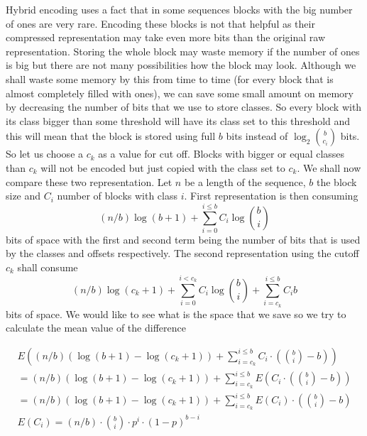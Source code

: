 Hybrid encoding uses a fact that in some sequences blocks with the big number
of ones are very rare. Encoding these blocks is not that helpful as their
compressed representation may take even more bits than the original raw
representation. Storing the whole block may waste memory if the number of
ones is big but there are not many possibilities how the block may look.
Although we shall waste some memory by this from time to time (for every
block that is almost completely filled with ones), we can save some small
amount on memory by decreasing the number of bits that we use to store
classes. So every block with its class bigger than some threshold will
have its class set to this threshold and this will mean that the block
is stored using full $b$ bits instead of $\log_2{b\choose c_i}$ bits.
So let us choose a $c_k$ as a value for cut off. Blocks with bigger or
equal classes than $c_k$ will not be encoded but just copied with
the class set to $c_k$. We shall now compare these two representation.
Let $n$ be a length of the sequence, $b$ the block size and $C_i$
number of blocks with class $i$. First representation is then consuming
$$(n/b)\log (b+1) + \sum_{i=0}^{i\leq b} C_i\log {b\choose i}$$
bits of space with the first and second term being the number of bits that
is used by the classes and offsets respectively. The second representation
using the cutoff $c_k$ shall consume
$$(n/b)\log (c_k+1)+\sum_{i=0}^{i<c_k}C_i\log {b\choose i} + \sum_{i=c_k}^{i\leq b}C_i b$$
bits of space. We would like to see what is the space that we save so we
try to calculate the mean value of the difference 

\begin{align*}
E\left((n/b)(\log (b+1) - \log (c_k+1)) + \sum_{i=c_k}^{i\leq b}C_i\cdot \left({b\choose i} - b\right)\right)\\
=(n/b)(\log (b+1) - \log (c_k+1)) + \sum_{i=c_k}^{i\leq b}E\left(C_i\cdot \left({b\choose i} - b\right)\right)\\
=(n/b)(\log (b+1) - \log (c_k+1)) + \sum_{i=c_k}^{i\leq b}E(C_i)\cdot \left({b\choose i} - b\right)\\
E(C_i) = (n/b)\cdot {b\choose i}\cdot p^i\cdot (1-p)^{b-i}
\end{align*}